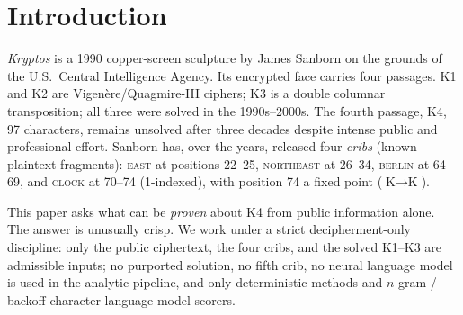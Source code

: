 \documentclass[11pt]{article}
\theoremstyle{plain}
\theoremstyle{definition}
\newcommand{\K}{\textsf{K4}}
\begin{document}
\begin{abstract}
hypothesized crib. \K{}'s free positions are therefore under-determined by the public,
decipherment-legal inputs we consider (its ciphertext, four cribs, and deterministic
character-level priors), and relative to the chart-model family we adopt, pending
exactly one external fact: a measured per-position selector or a fifth positional crib.
We are precise about this: a unique intended plaintext still exists under Sanborn's
full key, so we make no claim of unsolvability. We give the contributions, the falsified hypotheses,
the limits, and the methodology (including an independent re-derivation protocol that
corrected a community-propagated error about the engraving layout).
\end{abstract}

\section{Introduction}\label{sec:intro}

\emph{Kryptos} is a 1990 copper-screen sculpture by James Sanborn on the grounds of
the U.S.\ Central Intelligence Agency. Its encrypted face carries four passages.
K1 and K2 are Vigen\`ere/Quagmire-III ciphers; K3 is a double columnar
transposition; all three were solved in the 1990s--2000s. The fourth passage,
\K{}, 97 characters, remains unsolved after three decades despite intense public
and professional effort. Sanborn has, over the years, released four \emph{cribs}
(known-plaintext fragments): \textsc{east} at positions 22--25, \textsc{northeast}
at 26--34, \textsc{berlin} at 64--69, and \textsc{clock} at 70--74 (1-indexed),
with position 74 a fixed point ($\text{K}\to\text{K}$).

This paper asks what can be \emph{proven} about \K{} from public information
alone. The answer is unusually crisp. We work under a
strict decipherment-only discipline: only the public ciphertext, the four cribs,
and the solved K1--K3 are admissible inputs; no purported solution, no fifth crib,
no neural language model is used in the analytic pipeline, and only deterministic
methods and $n$-gram / backoff character language-model scorers.
\end{document}
